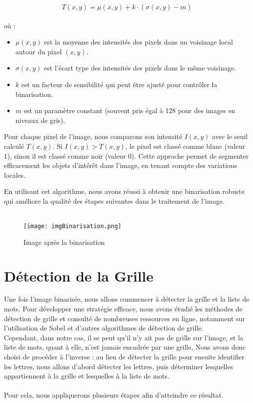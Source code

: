 \documentclass{article}
\begin{document}
$$
T(x, y) = \mu(x, y) + k \cdot \left( \sigma(x, y) - m \right)
$$
\\
où :
\begin{itemize}
    \item \(\mu(x, y)\) est la moyenne des intensités des pixels dans un voisinage local autour du pixel \((x, y)\).
    \item \(\sigma(x, y)\) est l'écart type des intensités des pixels dans le même voisinage.
    \item \(k\) est un facteur de sensibilité qui peut être ajusté pour contrôler la binarisation.
    \item \(m\) est un paramètre constant (souvent pris égal à 128 pour des images en niveaux de gris).
\end{itemize}
\vspace{0.5cm}
Pour chaque pixel de l'image, nous comparons son intensité \(I(x, y)\) avec le seuil calculé \(T(x, y)\). Si \(I(x, y) > T(x, y)\), le pixel est classé comme blanc (valeur 1), sinon il est classé comme noir (valeur 0). Cette approche permet de segmenter efficacement les objets d'intérêt dans l'image, en tenant compte des variations locales.

En utilisant cet algorithme, nous avons réussi à obtenir une binarisation robuste qui améliore la qualité des étapes suivantes dans le traitement de l'image.
\\\\
\begin{figure}[H]
    \centering
    \texttt{[image: imgBinarisation.png]}
    \caption{Image après la binarisation}
\end{figure}

\section{Détection de la Grille}

Une fois l'image binarisée, nous allons commencer à détecter la grille et la liste de mots. Pour développer une stratégie efficace, nous avons étudié les méthodes de détection de grille et consulté de nombreuses ressources en ligne, notamment sur l'utilisation de Sobel et d'autres algorithmes de détection de grille. 
\\
Cependant, dans notre cas, il se peut qu'il n'y ait pas de grille sur l'image, et la liste de mots, quant à elle, n'est jamais encadrée par une grille. Nous avons donc choisi de procéder à l'inverse : au lieu de détecter la grille pour ensuite identifier les lettres, nous allons d'abord détecter les lettres, puis déterminer lesquelles appartiennent à la grille et lesquelles à la liste de mots. 
\\\\
Pour cela, nous appliquerons plusieurs étapes afin d'atteindre ce résultat.
\end{document}
